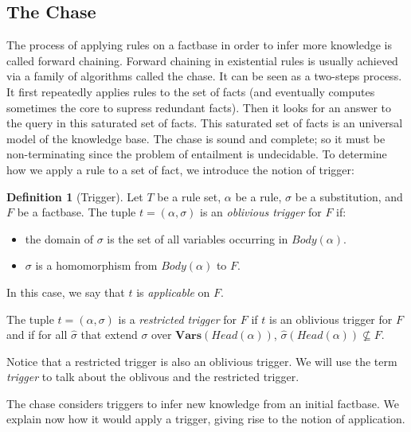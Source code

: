 \documentclass{article}
\theoremstyle{definition}
\newtheorem{definition}{Definition}[section]
\theoremstyle{remark}
\newcommand{\Vars}{\textbf{Vars}}
\begin{document}
\subsection{The Chase}

The process of applying rules on a factbase in order to infer more knowledge is called forward chaining.   Forward  chaining  in  existential  rules  is  usually achieved  via  a  family  of  algorithms  called the  chase. It can be seen as a two-steps process. It first repeatedly applies rules to the set of facts (and eventually computes sometimes the core to supress redundant facts). Then it looks for an answer to the query in this saturated set of facts. This saturated set of facts is an universal model of the knowledge base. The chase is sound and complete; so it must be non-terminating since the problem of entailment is undecidable. To determine how we apply a rule to a set of fact, we introduce the notion of trigger:

\begin{definition}[Trigger]
Let $T$ be a rule set, $\alpha$ be a rule, $\sigma$ be a substitution, and $F$ be a factbase. The tuple $t = (\alpha,\sigma)$ is an \emph{oblivious trigger} for $F$ if: 
\begin{itemize}
\item the domain of $\sigma$ is the set of all variables occurring in $Body(\alpha)$.
\item $\sigma$ is a homomorphism from $Body(\alpha)$ to $F$.
\end{itemize}
In this case, we say that $t$ is \emph{applicable} on $F$.

The tuple $t = (\alpha,\sigma)$ is a \emph{restricted trigger} for $F$ if $t$ is an oblivious trigger for $F$ and if for all $\hat \sigma$ that extend $\sigma$ over $\Vars(\textit{Head}(\alpha))$, $\hat \sigma(Head(\alpha)) \nsubseteq F$.
\end{definition} 



Notice that a restricted trigger is also an oblivious trigger. We will use the term \emph{trigger} to talk about the oblivous and the restricted trigger.

The chase considers triggers to infer new knowledge from an initial factbase. We explain now how it would apply a trigger, giving rise to the notion of application. 
\end{document}
